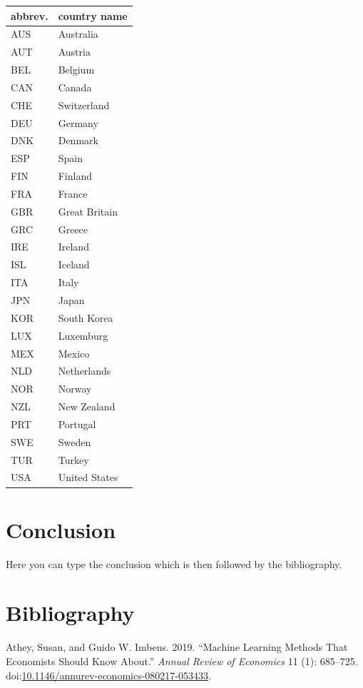 \documentclass[11pt]{article}
\begin{document}
\begin{center}
\begin{tabular}{ll}
abbrev. & country name\\
\hline
AUS & Australia\\
AUT & Austria\\
BEL & Belgium\\
CAN & Canada\\
CHE & Switzerland\\
DEU & Germany\\
DNK & Denmark\\
ESP & Spain\\
FIN & Finland\\
FRA & France\\
GBR & Great Britain\\
GRC & Greece\\
IRE & Ireland\\
ISL & Iceland\\
ITA & Italy\\
JPN & Japan\\
KOR & South Korea\\
LUX & Luxemburg\\
MEX & Mexico\\
NLD & Netherlands\\
NOR & Norway\\
NZL & New Zealand\\
PRT & Portugal\\
SWE & Sweden\\
TUR & Turkey\\
USA & United States\\
\end{tabular}
\end{center}


\section{Conclusion}
\label{sec:org8064eda}

Here you can type the conclusion which is then followed by the bibliography.

\section{Bibliography}
\label{sec:org711c5e8}



\hypertarget{citeproc_bib_item_1}{Athey, Susan, and Guido W. Imbens. 2019. “Machine Learning Methods That Economists Should Know About.” \textit{Annual Review of Economics} 11 (1): 685–725. doi:\href{https://doi.org/10.1146/annurev-economics-080217-053433}{10.1146/annurev-economics-080217-053433}.}
\end{document}
